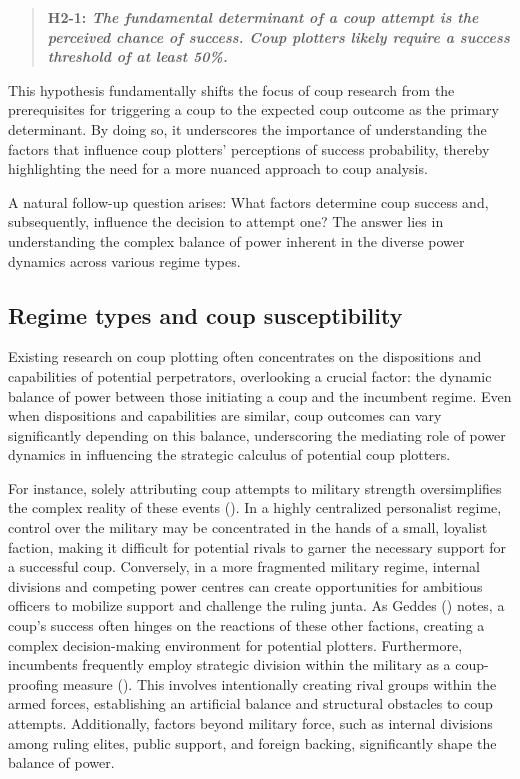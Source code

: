 \documentclass[
  12pt,
]{report}
\begin{document}
\begin{quote}
\textbf{H2-1: \emph{The fundamental determinant of a coup attempt is the
perceived chance of success. Coup plotters likely require a success
threshold of at least 50\%.}}
\end{quote}

This hypothesis fundamentally shifts the focus of coup research from the
prerequisites for triggering a coup to the expected coup outcome as the
primary determinant. By doing so, it underscores the importance of
understanding the factors that influence coup plotters' perceptions of
success probability, thereby highlighting the need for a more nuanced
approach to coup analysis.

A natural follow-up question arises: What factors determine coup success
and, subsequently, influence the decision to attempt one? The answer
lies in understanding the complex balance of power inherent in the
diverse power dynamics across various regime types.

\subsection{Regime types and coup
susceptibility}\label{regime-types-and-coup-susceptibility}

Existing research on coup plotting often concentrates on the
dispositions and capabilities of potential perpetrators, overlooking a
crucial factor: the dynamic balance of power between those initiating a
coup and the incumbent regime. Even when dispositions and capabilities
are similar, coup outcomes can vary significantly depending on this
balance, underscoring the mediating role of power dynamics in
influencing the strategic calculus of potential coup plotters.

For instance, solely attributing coup attempts to military strength
oversimplifies the complex reality of these events
(). In a highly centralized
personalist regime, control over the military may be concentrated in the
hands of a small, loyalist faction, making it difficult for potential
rivals to garner the necessary support for a successful coup.
Conversely, in a more fragmented military regime, internal divisions and
competing power centres can create opportunities for ambitious officers
to mobilize support and challenge the ruling junta. As Geddes
() notes, a coup's success often hinges
on the reactions of these other factions, creating a complex
decision-making environment for potential plotters. Furthermore,
incumbents frequently employ strategic division within the military as a
coup-proofing measure (). This involves intentionally creating rival groups within the
armed forces, establishing an artificial balance and structural
obstacles to coup attempts. Additionally, factors beyond military force,
such as internal divisions among ruling elites, public support, and
foreign backing, significantly shape the balance of power.
\end{document}

